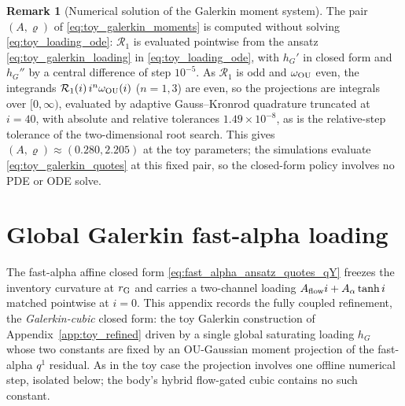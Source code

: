 \documentclass[11pt,a4paper]{article}
\theoremstyle{plain}
\theoremstyle{definition}
\newtheorem{remark}{Remark}[section]
\begin{document}
\begin{remark}[Numerical solution of the Galerkin moment system]
\label{rem:galerkin_numerics}
The pair \((A,\varrho)\) of \eqref{eq:toy_galerkin_moments} is computed without
solving \eqref{eq:toy_loading_ode}: \(\mathcal R_1\) is evaluated pointwise from
the ansatz \eqref{eq:toy_galerkin_loading} in \eqref{eq:toy_loading_ode}, with
\(h_G'\) in closed form and \(h_G''\) by a central difference of step
\(10^{-5}\).  As \(\mathcal R_1\) is odd and \(\omega_{\rm OU}\) even, the
integrands \(\mathcal R_1(i)\,i^n\omega_{\rm OU}(i)\) (\(n=1,3\)) are even, so
the projections are integrals over \([0,\infty)\), evaluated by adaptive
Gauss--Kronrod quadrature truncated at \(i=40\), with absolute and relative
tolerances \(1.49\times10^{-8}\), as is the relative-step tolerance of the
two-dimensional root search.  This gives \((A,\varrho)\approx(0.280,2.205)\) at
the toy parameters; the simulations evaluate \eqref{eq:toy_galerkin_quotes} at
this fixed pair, so the closed-form policy involves no PDE or ODE solve.
\end{remark}

\section{Global Galerkin fast-alpha loading}
\label{app:fast_alpha_refined}

The fast-alpha affine closed form \eqref{eq:fast_alpha_ansatz_quotes_qY}
freezes the inventory curvature at \(r_{\rm G}\) and carries a two-channel
loading \(A_{\rm flow}i+A_\alpha\tanh i\) matched pointwise at \(i=0\).  This
appendix records the fully coupled refinement, the \emph{Galerkin-cubic}
closed form: the toy Galerkin construction of Appendix~\ref{app:toy_refined}
driven by a single global saturating loading \(h_G\) whose two constants are
fixed by an OU-Gaussian moment projection of the fast-alpha \(q^1\) residual.
As in the toy case the projection involves one offline numerical step,
isolated below; the body's hybrid flow-gated cubic contains no such constant.
\end{document}
